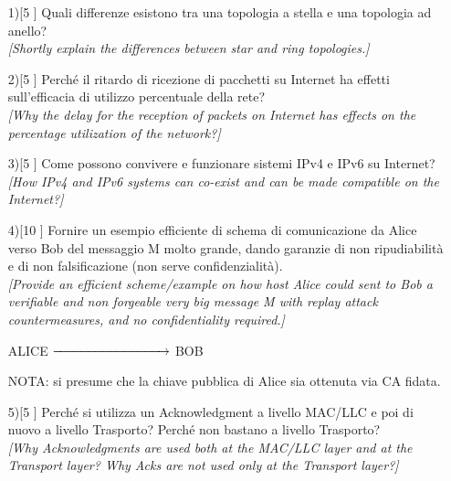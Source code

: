 \documentclass[a4paper, 12pt]{article}
\begin{document}
\begin{enumerate}
    \item[1)[5]] Quali differenze esistono tra una topologia a stella e una topologia ad anello? \\
    \textit{[Shortly explain the differences between star and ring topologies.]}
    \vspace{4cm}

    \item[2)[5]] Perché il ritardo di ricezione di pacchetti su Internet ha effetti sull'efficacia di utilizzo percentuale della rete? \\
    \textit{[Why the delay for the reception of packets on Internet has effects on the percentage utilization of the network?]}
    \vspace{4cm}
    
    \item[3)[5]] Come possono convivere e funzionare sistemi IPv4 e IPv6 su Internet? \\
    \textit{[How IPv4 and IPv6 systems can co-exist and can be made compatible on the Internet?]}
    \vspace{4cm}

    \newpage

    \item[4)[10]] Fornire un esempio efficiente di schema di comunicazione da Alice verso Bob del messaggio M molto grande, dando garanzie di non ripudiabilità e di non falsificazione (non serve confidenzialità). \\
    \textit{[Provide an efficient scheme/example on how host Alice could sent to Bob a verifiable and non forgeable very big message M with replay attack countermeasures, and no confidentiality required.]}
    
    \vspace{4cm}
    
    \begin{center}
        ALICE \quad $\xrightarrow{\hspace*{3cm}}$ \quad BOB
    \end{center}

    \vspace{1cm}
    
    \noindent NOTA: si presume che la chiave pubblica di Alice sia ottenuta via CA fidata.
    \vspace{2cm}

    \item[5)[5]] Perché si utilizza un Acknowledgment a livello MAC/LLC e poi di nuovo a livello Trasporto? Perché non bastano a livello Trasporto? \\
    \textit{[Why Acknowledgments are used both at the MAC/LLC layer and at the Transport layer? Why Acks are not used only at the Transport layer?]}
    \vspace{4cm}


\end{enumerate}
\end{document}
